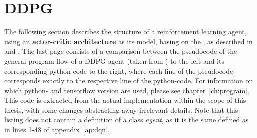 
\begin{landscape}
	\begin{parcolumns}[distance=0.1em,colwidths={1=33em}]{2}
		\label{ap:dqn_comparison}
		\colchunk[1]{ }
		\colchunk[2]{  }
	\end{parcolumns}
\end{landscape}

\section{DDPG}
\label{ap:ddpg}

The following section describes the structure of a reinforcement learning agent, using an \textbf{actor-critic architecture} as its model, basing on the , as described in \cite{silver_deterministic_2014} and \cite{lillicrap_continuous_2015}. The last page consists of a comparison between the pseudocode of the general program flow of a DDPG-agent (taken from \cite{lillicrap_continuous_2015}) to the left and its corresponding python-code to the right, where each line of the pseudocode corresponds exactly to the respective line of the python-code. For information on which python- and tensorflow version are used, please see chapter~\ref{ch:program}. This code is extracted from the actual implementation within the scope of this thesis, with some changes abstracting away irrelevant details. Note that this listing does not contain a definition of a class \textit{agent}, as it is the same defined as in lines 1-48 of appendix~\ref{ap:dqn}.\\


\begin{landscape}
	\begin{parcolumns}[distance=0.1em,colwidths={1=33em}]{2}
		\label{ap:ddpg_comparison}
		\colchunk[1]{ }
		\colchunk[2]{  }
	\end{parcolumns}
\end{landscape}



